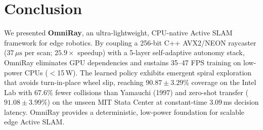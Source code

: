 \documentclass[conference]{IEEEtran}
\begin{document}
\section{Conclusion}
We presented \textbf{OmniRay}, an ultra-lightweight, CPU-native Active SLAM framework for edge robotics. By coupling a 256-bit C++ AVX2/NEON raycaster ($37\,\mu\text{s}$ per scan; $25.9\times$ speedup) with a 5-layer self-adaptive autonomy stack, OmniRay eliminates GPU dependencies and sustains 35--47 FPS training on low-power CPUs ($<$15\,W). The learned policy exhibits emergent spiral exploration that avoids turn-in-place wheel slip, reaching $90.87 \pm 3.29\%$ coverage on the Intel Lab with 67.6\% fewer collisions than Yamauchi (1997) and zero-shot transfer ($91.08 \pm 3.99\%$) on the unseen MIT Stata Center at constant-time $3.09$\,ms decision latency. OmniRay provides a deterministic, low-power foundation for scalable edge Active SLAM.
\end{document}
